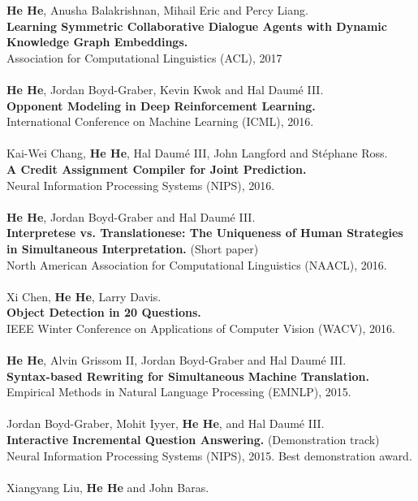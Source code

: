 \documentclass[a4paper,11pt]{article}
\begin{document}
{\bf He He}, Anusha Balakrishnan, Mihail Eric and Percy Liang.\\
{\bf Learning Symmetric Collaborative Dialogue Agents with Dynamic Knowledge Graph Embeddings.}\\
Association for Computational Linguistics (ACL), 2017\\
\\
{\bf He He}, Jordan Boyd-Graber, Kevin Kwok and Hal Daum\'e III.\\
{\bf Opponent Modeling in Deep Reinforcement Learning.}\\
International Conference on Machine Learning (ICML), 2016.\\
\\
Kai-Wei Chang, {\bf He He}, Hal Daum\'e III, John Langford and St\'ephane Ross.\\
{\bf A Credit Assignment Compiler for Joint Prediction.}\\
Neural Information Processing Systems (NIPS), 2016.\\ 
\\
{\bf He He}, Jordan Boyd-Graber and Hal Daum\'e III.\\
{\bf Interpretese vs. Translationese: The Uniqueness of Human Strategies in Simultaneous Interpretation.} (Short paper)\\
North American Association for Computational Linguistics (NAACL), 2016.\\
\\
Xi Chen, {\bf He He}, Larry Davis.\\
{\bf Object Detection in 20 Questions.}\\
IEEE Winter Conference on Applications of Computer Vision (WACV), 2016.\\
\\
{\bf He He}, Alvin Grissom II, Jordan Boyd-Graber and Hal Daum\'e III.\\
{\bf Syntax-based Rewriting for Simultaneous Machine Translation.}\\
Empirical Methods in Natural Language Processing (EMNLP), 2015.\\
\\
Jordan Boyd-Graber, Mohit Iyyer, {\bf He He}, and Hal Daum\'e III.\\
{\bf Interactive Incremental Question Answering.} (Demonstration track)\\
Neural Information Processing Systems (NIPS), 2015. 
Best demonstration award.\\
\\
Xiangyang Liu, {\bf He He} and John Baras.\\
\end{document}

